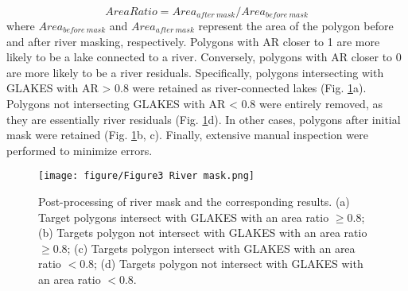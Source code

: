 \documentclass[preprint,12pt,authoryear]{elsarticle}
\begin{document}
\begin{equation}
Area Ratio = Area_{after\ mask}/Area_{before\ mask}
\end{equation}
where $Area_{before\ mask}$ and $Area_{after\ mask}$ represent the area of the polygon before and after river masking, respectively. Polygons with AR closer to 1 are more likely to be a lake connected to a river. Conversely, polygons with AR closer to 0 are more likely to be a river residuals. Specifically, polygons intersecting with GLAKES with AR > 0.8 were retained as river-connected lakes (Fig. \ref{fig:Fig3}a). Polygons not intersecting GLAKES with AR < 0.8 were entirely removed, as they are essentially river residuals (Fig. \ref{fig:Fig3}d). In other cases, polygons after initial mask were retained (Fig. \ref{fig:Fig3}b, c). Finally, extensive manual inspection were performed to minimize errors.

\begin{figure}[h]
    \centering
    \texttt{[image: figure/Figure3 River mask.png]}
    \caption{Post-processing of river mask and the corresponding results. (a) Target polygons intersect with GLAKES with an area ratio $\geq$0.8; (b) Targets polygon not intersect with GLAKES with an area ratio $\geq$0.8; (c) Targets polygon intersect with GLAKES with an area ratio $<$0.8; (d) Targets polygon not intersect with GLAKES with an area ratio $<$0.8.}
    \label{fig:Fig3}
\end{figure}
\end{document}
